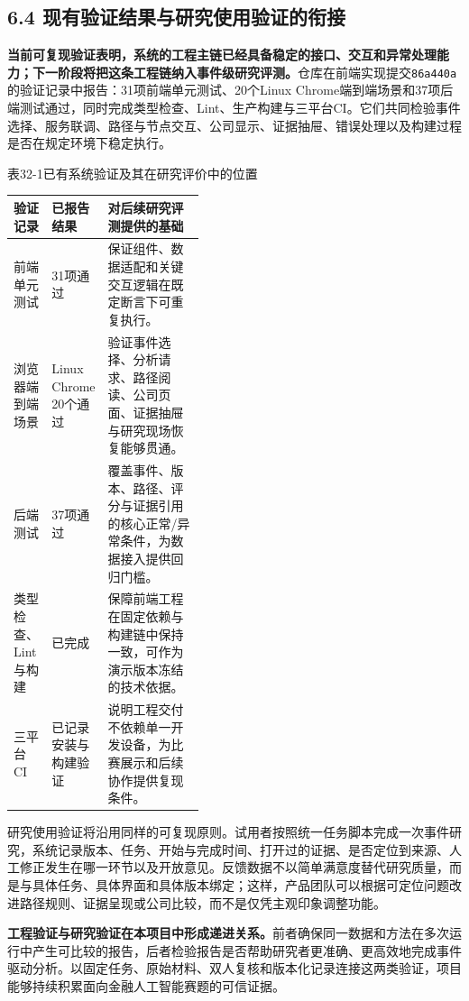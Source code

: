 \subsection*{6.4 现有验证结果与研究使用验证的衔接}\label{page:32}
\noindent\textbf{当前可复现验证表明，系统的工程主链已经具备稳定的接口、交互和异常处理能力；下一阶段将把这条工程链纳入事件级研究评测。}仓库在前端实现提交\texttt{86a440a}的验证记录中报告：31项前端单元测试、20个Linux Chrome端到端场景和37项后端测试通过，同时完成类型检查、Lint、生产构建与三平台CI。它们共同检验事件选择、服务联调、路径与节点交互、公司显示、证据抽屉、错误处理以及构建过程是否在规定环境下稳定执行\cite{lhy-repository,lhy-frontend}。

\begin{center}\small 表32-1\quad 已有系统验证及其在研究评价中的位置\par\vspace{1mm}
\begin{tabularx}{\linewidth}{p{0.20\linewidth}p{0.22\linewidth}X}
\toprule
验证记录 & 已报告结果 & 对后续研究评测提供的基础\\
\midrule
前端单元测试 & 31项通过 & 保证组件、数据适配和关键交互逻辑在既定断言下可重复执行。\\
浏览器端到端场景 & Linux Chrome 20个通过 & 验证事件选择、分析请求、路径阅读、公司页面、证据抽屉与研究现场恢复能够贯通。\\
后端测试 & 37项通过 & 覆盖事件、版本、路径、评分与证据引用的核心正常/异常条件，为数据接入提供回归门槛。\\
类型检查、Lint与构建 & 已完成 & 保障前端工程在固定依赖与构建链中保持一致，可作为演示版本冻结的技术依据。\\
三平台CI & 已记录安装与构建验证 & 说明工程交付不依赖单一开发设备，为比赛展示和后续协作提供复现条件。\\
\bottomrule
\end{tabularx}\end{center}

研究使用验证将沿用同样的可复现原则。试用者按照统一任务脚本完成一次事件研究，系统记录版本、任务、开始与完成时间、打开过的证据、是否定位到来源、人工修正发生在哪一环节以及开放意见。反馈数据不以简单满意度替代研究质量，而是与具体任务、具体界面和具体版本绑定；这样，产品团队可以根据可定位问题改进路径规则、证据呈现或公司比较，而不是仅凭主观印象调整功能。

\noindent\textbf{工程验证与研究验证在本项目中形成递进关系。}前者确保同一数据和方法在多次运行中产生可比较的报告，后者检验报告是否帮助研究者更准确、更高效地完成事件驱动分析。以固定任务、原始材料、双人复核和版本化记录连接这两类验证，项目能够持续积累面向金融人工智能赛题的可信证据。
